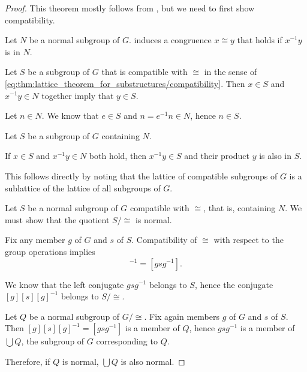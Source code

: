 \begin{proof}
  This theorem mostly follows from , but we need to first show compatibility.

  Let \( N \) be a normal subgroup of \( G \).  induces a congruence \( x \cong y \) that holds if \( x^{-1} y \) is in \( N \).


  \SufficiencySubProof* Let \( S \) be a subgroup of \( G \) that is compatible with \( {\cong} \) in the sense of \eqref{eq:thm:lattice_theorem_for_substructures/compatibility}. Then \( x \in S \) and \( x^{-1} y \in N \) together imply that \( y \in S \).

  Let \( n \in N \). We know that \( e \in S \) and \( n = e^{-1} n \in N \), hence \( n \in S \).

  \NecessitySubProof* Let \( S \) be a subgroup of \( G \) containing \( N \).

  If \( x \in S \) and \( x^{-1} y \in N \) both hold, then \( x^{-1} y \in S \) and their product \( y \) is also in \( S \).

   This follows directly by noting that the lattice of compatible subgroups of \( G \) is a sublattice of the lattice of all subgroups of \( G \).


  \SufficiencySubProof* Let \( S \) be a normal subgroup of \( G \) compatible with \( {\cong} \), that is, containing \( N \). We must show that the quotient \( S / {\cong} \) is normal.

  Fix any member \( g \) of \( G \) and \( s \) of \( S \). Compatibility of \( {\cong} \) with respect to the group operations implies
  \begin{equation*}
    [g] [s] [g]^{-1} = [g s g^{-1}].
  \end{equation*}

  We know that the left conjugate \( g s g^{-1} \) belongs to \( S \), hence the conjugate \( [g] [s] [g]^{-1} \) belongs to \( S / {\cong} \).

  \NecessitySubProof* Let \( Q \) be a normal subgroup of \( G / {\cong} \). Fix again members \( g \) of \( G \) and \( s \) of \( S \). Then \( [g] [s] [g]^{-1} = [g s g^{-1}] \) is a member of \( Q \), hence \( g s g^{-1} \) is a member of \( \bigcup Q \), the subgroup of \( G \) corresponding to \( Q \).

  Therefore, if \( Q \) is normal, \( \bigcup Q \) is also normal.
\end{proof}

